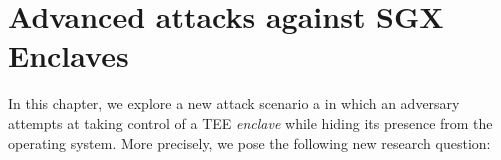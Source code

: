 \chapter{Advanced attacks against SGX Enclaves}
\label{chp:advanced-threats} 

%
%

In this chapter, we explore a new attack scenario a in which an adversary 
attempts at taking control of a TEE \emph{enclave} while hiding its presence 
from the operating system.
More precisely, we pose the following new research question:

